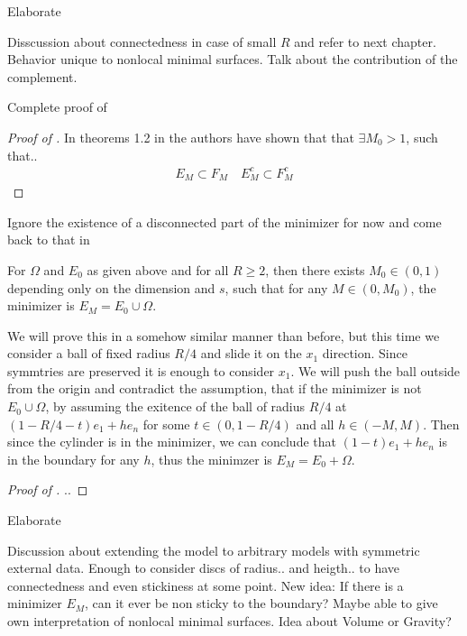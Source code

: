 \begin{TODO}
	Elaborate
\end{TODO}
Disscussion about connectedness in case of small \( R \) and refer to next chapter.
Behavior unique to nonlocal minimal surfaces.\newline
Talk about the contribution of the complement.

\begin{TODO}
	Complete proof of 
\end{TODO}
\begin{proof}[Proof of ]
	In theorems 1.2 in \cite{dipierro2020disconnectedness} the authors have shown that
	that \( \exists M_0 > 1 \), such that..
	\begin{gather*}
		E_M \subset F_M \quad E_M^c \subset F_M^c
	\end{gather*}
\end{proof}



\begin{TODO}
	Ignore the existence of a disconnected part of the minimizer for now and come back to
	that in 
\end{TODO}

\begin{theorem}
	\label{thm:105}
	For \( \Omega \) and \( E_0 \) as given above and for all \( R \geq 2 \), then there exists
	\( M_0 \in (0, 1) \) depending only on the dimension and \( s \), such that for any \( M \in
	(0, M_0) \), the minimizer is \( E_M = E_0 \cup \Omega \).
\end{theorem}

We will prove this in a somehow similar manner than before, but this time we consider a
ball of fixed radius \( R/4 \) and slide it on the \( x_1 \) direction. Since symmtries
are preserved it is enough to consider \( x_1 \). We will push the ball outside from the
origin and contradict the assumption, that if the minimizer is not \( E_0 \cup \Omega \),
by assuming the exitence of the ball of radius \( R/4 \) at \( (1 - R/4 - t)e_1 + h e_n
\) for some \( t \in (0, 1 - R/4) \) and all \( h \in (- M, M) \). Then since the cylinder is
in the minimizer, we can conclude that \( (1 - t)e_1 + h e_n \) is in the boundary for
any \( h \), thus the minimzer is \( E_M = E_0 + \Omega \).

\begin{proof}[Proof of ]
	..
\end{proof}


\begin{TODO}
	Elaborate
\end{TODO}
Discussion about extending the model to arbitrary models with symmetric external data.
Enough to consider discs of radius.. and heigth.. to have connectedness and even
stickiness at some point.\newline
New idea: If there is a minimizer \( E_M \), can it ever be non sticky to the
boundary?\newline
Maybe able to give own interpretation of nonlocal minimal surfaces. Idea about Volume or
Gravity?
